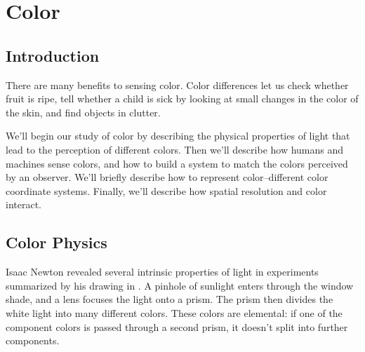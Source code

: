 

\chapter{Color}
\label{chapter:color}


\section{Introduction}

There are many benefits to sensing color.  Color differences let us
check whether fruit is ripe, tell whether a child is sick by looking
at small changes in the color of the skin, and find objects in
clutter.  

We'll begin our study of color by describing the physical properties of light that lead to the perception of different colors.  Then we'll describe how humans and machines sense colors, and how to build a system to match the colors perceived by an observer.  We'll briefly describe how to represent color--different color coordinate systems.  Finally, we'll describe how spatial resolution and color interact.


\section{Color Physics}


Isaac Newton revealed several intrinsic
properties of light in experiments summarized by his drawing in
\fig{\ref{fig:prism}}. A pinhole of sunlight enters through the
window shade, and a lens focuses the light onto a prism.  The prism
then divides the white light into many different colors.  These
colors are elemental: if one of
the component colors is passed through a second prism, it doesn't
split into further components.


